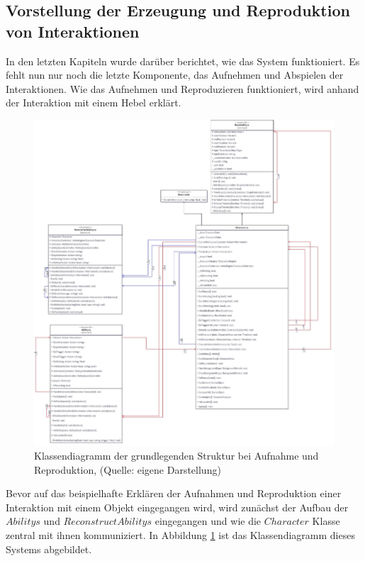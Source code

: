 \subsection{Vorstellung der Erzeugung und Reproduktion von Interaktionen}\label{sec:interactions_reproduction}
In den letzten Kapiteln wurde darüber berichtet, wie das System funktioniert. Es fehlt nun nur noch die letzte Komponente, das Aufnehmen und Abspielen der Interaktionen. Wie das Aufnehmen und Reproduzieren funktioniert, wird anhand der Interaktion mit einem Hebel erklärt.

\begin{figure}[ht]
\centering
\includegraphics[width=1\linewidth]{content/pictures/Interaction_Reconstruct_class.jpg}
\caption{Klassendiagramm der grundlegenden Struktur bei Aufnahme und Reproduktion, (Quelle: eigene Darstellung)}
\label{fig:record_reconstruct_class}
\end{figure}

Bevor auf das beispielhafte Erklären der Aufnahmen und Reproduktion einer Interaktion mit einem Objekt eingegangen wird, wird zunächst der Aufbau der $Abilitys$ und $ReconstructAbilitys$ eingegangen und wie die $Character$ Klasse zentral mit ihnen kommuniziert. In Abbildung \ref{fig:record_reconstruct_class} ist das Klassendiagramm dieses Systems abgebildet.

